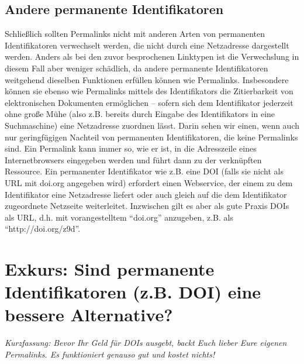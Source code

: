 \documentclass[12pt, a4paper]{article}
\begin{document}
\subsection{Andere permanente Identifikatoren}
\label{andere-permanente-identifikatoren}

Schließlich sollten Permalinks nicht mit anderen Arten von permanenten
Identifikatoren verwechselt werden, die nicht durch eine Netzadresse
dargestellt werden. Anders als bei den zuvor besprochenen Linktypen
ist die Verwechslung in diesem Fall aber weniger schädlich, da andere
permanente Identifikatoren weitgehend dieselben Funktionen erfüllen
können wie Permalinks. Insbesondere können sie ebenso wie Permalinks
mittels des Identifikators die Zitierbarkeit von elektronischen
Dokumenten ermöglichen -- sofern sich dem Identifikator jederzeit ohne
große Mühe (also z.B. bereits durch Eingabe des Identifikators in eine
Suchmaschine) eine Netzadresse zuordnen lässt. Darin sehen wir einen,
wenn auch nur geringfügigen Nachteil von permanenten Identifikatoren,
die keine Permalinks sind. Ein Permalink kann immer so, wie er ist, in
die Adresszeile eines Internetbrowsers eingegeben werden und führt
dann zu der verknüpften Ressource. Ein permanenter Identifikator wie
z.B. eine DOI (falls sie nicht als URL mit doi.org angegeben wird)
erfordert einen Webservice, der einem zu dem Identifikator eine
Netzadresse liefert oder auch gleich auf die dem Identifikator
zugeordnete Netzseite weiterleitet. Inzwischen gilt es aber als gute
Praxis DOIs als URL, d.h. mit vorangestelltem ``doi.org'' anzugeben,
z.B. als ``http://doi.org/z9d''.

\section{Exkurs: Sind permanente Identifikatoren (z.B. DOI) eine bessere
  Alternative?}
\label{sind-permanente-identifikatoren-z.b.-doi-eine-bessere-alternative}

{\em Kurzfassung: Bevor Ihr Geld für DOIs ausgebt, backt Euch lieber 
Eure eigenen Permalinks. Es funktioniert genauso gut und kostet nichts!}
\end{document}
